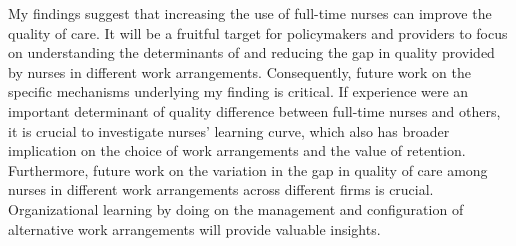 \documentclass[final,12pt]{article}
\newcommand{\myreferences}{/Users/kunheekim/Dropbox/Research/dissertn_bib}
\begin{document}
My findings suggest that increasing the use of full-time nurses can improve the quality of care. %
It will be a fruitful target for policymakers and providers to focus on understanding the determinants of and reducing the gap in quality provided by nurses in different work arrangements.
Consequently, future work on the specific mechanisms underlying my finding is critical. If experience were an important determinant of quality difference between full-time nurses and others, it is crucial to investigate nurses' learning curve, which also has broader implication on the choice of work arrangements and the value of retention.
Furthermore, future work on the variation in the gap in quality of care among nurses in different work arrangements across different firms is crucial. Organizational learning by doing on the management and configuration of alternative work arrangements will provide valuable insights.


\newpage


{}

\end{document}
